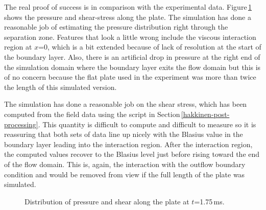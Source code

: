 \medskip
The real proof of success is in comparison with the experimental data.
Figure\,\ref{fig:hakkinen-plate-data-compare} shows the pressure and shear-stress along the plate.
The simulation has done a reasonable job of estimating the pressure distribution right 
through the separation zone.
Features that look a little wrong include the viscous interaction region at $x$=0,
which is a bit extended because of lack of resolution at the start of the boundary layer.
Also, there is an artificial drop in pressure at the right end of the simulation domain
where the boundary layer exits the flow domain but this is of no concern because  
the flat plate used in the experiment was more than twice the length of this simulated version.

\medskip
The simulation has done a reasonable job on the shear stress,
which has been computed from the field data using the script in Section\,\ref{hakkinen-post-processing}.
This quantity is difficult to compute and difficult to measure so it is reassuring that both
sets of data line up nicely with the Blasius value in the boundary layer leading into the interaction region.
After the interaction region, the computed values recover to the Blasius level 
just before rising toward the end of the flow domain.
This is, again, the interaction with the outflow boundary condition and would be removed from view
if the full length of the plate was simulated.

\begin{figure}[htbp]
 \centering
 \caption{Distribution of pressure and shear along the plate at $t$=1.75\,ms.}
 \label{fig:hakkinen-plate-data-compare}
\end{figure}

